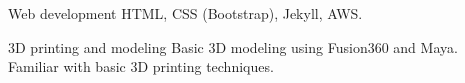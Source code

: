 

\begin{cvskills}

  \cvskill
    {Web development} %
    {HTML, CSS (Bootstrap), Jekyll, AWS.} %

  \cvskill
    {3D printing and modeling} %
    {Basic 3D modeling using Fusion360 and Maya. Familiar with basic 3D printing techniques.} %

\end{cvskills}
